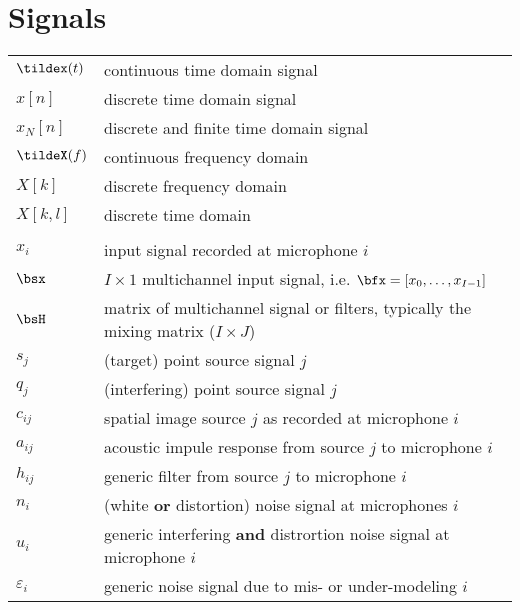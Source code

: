 \section*{Signals}
\begin{table}[H]
    \begin{tabular}{ll}
        $\tildex(t)$    & continuous time domain signal\\
        $x[n]$          & discrete time domain signal\\
        $x_N[n]$          & discrete and finite time domain signal\\
        $\tildeX(f)$    & continuous frequency domain\\
        $X[k]$          & discrete frequency domain\\
        $X[k,l]$        & discrete time domain\\
                        &                     \\
        $x_i$     & input signal recorded at microphone $i$\\
        $\bsx$    & $I \times 1$ multichannel input signal, i.e. $\bfx = [x_0, \ldots, x_{I-1}]$ \\
        $\bsH$    & matrix of multichannel signal or filters, typically the mixing matrix ($I \times J$)\\
        $s_j$     & (target) point source signal $j$ \\
        $q_j$     & (interfering) point source signal $j$ \\
        $c_{ij}$  & spatial image source $j$ as recorded at microphone $i$\\
        $a_{ij}$  & acoustic impule response from source $j$ to microphone $i$ \\
        $h_{ij}$  & generic filter from source $j$ to microphone $i$ \\
        $n_{i}$   & (white \textbf{or} distortion) noise signal at microphones $i$\\
        $u_{i}$   & generic interfering \textbf{and} distrortion noise signal at microphone $i$ \\
        $\varepsilon_{i}$   & generic noise signal due to mis- or under-modeling $i$ \\
    \end{tabular}
\end{table}

